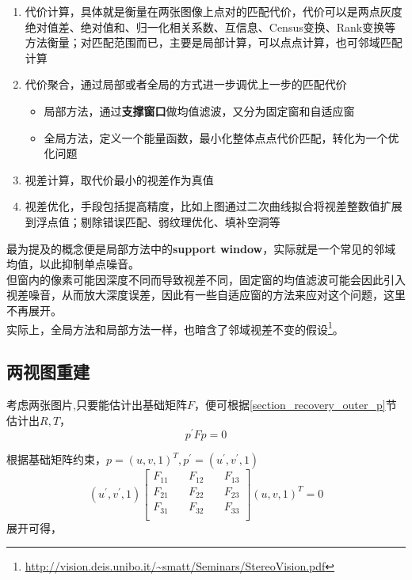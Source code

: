 			\begin{enumerate}
				\item 代价计算，具体就是衡量在两张图像上点对的匹配代价，代价可以是两点灰度绝对值差、绝对值和、归一化相关系数、互信息、Census变换、Rank变换等方法衡量；对匹配范围而已，主要是局部计算，可以点点计算，也可邻域匹配计算
				\item 代价聚合，通过局部或者全局的方式进一步调优上一步的匹配代价
					\begin{itemize}
						\item 局部方法，通过\textbf{支撑窗口}做均值滤波，又分为固定窗和自适应窗
						\item 全局方法，定义一个能量函数，最小化整体点点代价匹配，转化为一个优化问题
					\end{itemize}
				\item 视差计算，取代价最小的视差作为真值
				\item 视差优化，手段包括提高精度，比如上图通过二次曲线拟合将视差整数值扩展到浮点值；剔除错误匹配、弱纹理优化、填补空洞等
			\end{enumerate}

			最为提及的概念便是局部方法中的\textbf{support window}，实际就是一个常见的邻域均值，以此抑制单点噪音。\\

			但窗内的像素可能因深度不同而导致视差不同，固定窗的均值滤波可能会因此引入视差噪音，从而放大深度误差，因此有一些自适应窗的方法来应对这个问题，这里不再展开。\\

			实际上，全局方法和局部方法一样，也暗含了邻域视差不变的假设\footnote{\url{http://vision.deis.unibo.it/~smatt/Seminars/StereoVision.pdf}}。


	\subsection{两视图重建}

	考虑两张图片,只要能估计出基础矩阵$F$，便可根据\ref{section_recovery_outer_p}节估计出$R,T$，
	$$
		p^\prime F p = 0
	$$

	根据基础矩阵约束，$p=(u,v,1)^T,p^{\prime} = (u^{\prime}, v^{\prime},1)$
	$$
		(u^{\prime}, v^{\prime},1)
		\begin{bmatrix}
			F_{11}\quad& F_{12}\quad& F_{13}\\
			F_{21}\quad& F_{22}\quad& F_{23}\\
			F_{31}\quad& F_{32}\quad& F_{33}\\
		\end{bmatrix}
		(u,v,1)^T = 0
	$$
	展开可得，

